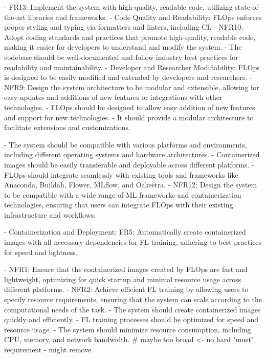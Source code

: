 \begin{itemize}
        - FR13: Implement the system with high-quality, readable code, utilizing state-of-the-art libraries and frameworks.
        - Code Quality and Readability:
            FLOps enforces proper styling and typing via formatters and linters, including CI.    
        - NFR10: Adopt coding standards and practices that promote high-quality, readable code, making it easier for developers to understand and modify the system.
        - The codebase should be well-documented and follow industry best practices for readability and maintainability.
        - Developer and Researcher Modifiability:
            FLOps is designed to be easily modified and extended by developers and researchers.
        - NFR9: Design the system architecture to be modular and extensible, allowing for easy updates and additions of new features or integrations with other technologies.
        - FLOps should be designed to allow easy addition of new features and support for new technologies.
        - It should provide a modular architecture to facilitate extensions and customizations.

        
        - The system should be compatible with various platforms and environments, including different operating systems and hardware architectures.
        - Containerized images should be easily transferable and deployable across different platforms.
        - FLOps should integrate seamlessly with existing tools and frameworks like Anaconda, Buildah, Flower, MLflow, and Oakestra.
        - NFR12: Design the system to be compatible with a wide range of ML frameworks and containerization technologies, ensuring that users can integrate FLOps with their existing infrastructure and workflows.


    - Containerization and Deployment:
        FR5: Automatically create containerized images with all necessary dependencies for FL training, adhering to best practices for speed and lightness.
    
    - NFR1: Ensure that the containerized images created by FLOps are fast and lightweight, optimizing for quick startup and minimal resource usage across different platforms.
    - NFR2: Achieve efficient FL training by allowing users to specify resource requirements, ensuring that the system can scale according to the computational needs of the task.
    - The system should create containerized images quickly and efficiently.
    - FL training processes should be optimized for speed and resource usage.
    - The system should minimize resource consumption, including CPU, memory, and network bandwidth. # maybe too broad <- no hard "must" requirement - might remove


\end{itemize}
